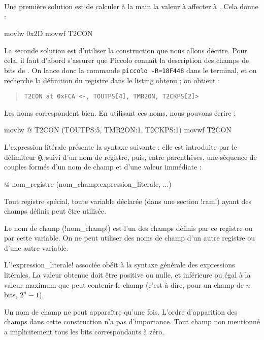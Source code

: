 Une première solution est de calculer à la main la valeur à affecter à . Cela donne :
\begin{piccolo}
movlw   0x2D
movwf   T2CON
\end{piccolo}

La seconde solution est d'utiliser la construction que nous allons décrire. Pour cela, il faut d'abord s’assurer que Piccolo connaît la description des champs de bits de . On lance donc la commande \texttt{piccolo -R=18F448} dans le terminal, et on recherche la définition du registre  dans le listing obtenu ; on obtient :
\begin{quote}
\texttt{\textquotesingle T2CON\textquotesingle~at 0xFCA <-, TOUTPS[4], TMR2ON, T2CKPS[2]>}
\end{quote}

Les noms correspondent bien. En utilisant ces noms, nous pouvons écrire :
\begin{piccolo}
movlw   @ T2CON (TOUTPS:5, TMR2ON:1, T2CKPS:1)
movwf   T2CON
\end{piccolo}

L'expression litérale présente la syntaxe suivante : elle est introduite par le délimiteur \texttt{@}, suivi d’un nom de registre, puis, entre parenthèses, une séquence de couples formés d’un nom de champ et d’une valeur immédiate :
\begin{piccolo}
  @ nom_registre (nom_champ:expression_literale, ...)
\end{piccolo}

Tout registre spécial, toute variable déclarée (dans une section \pic!ram!) ayant des champs définis peut être utilisée.

Le nom de champ (\pic!nom_champ!) est l’un des champs définis par ce registre ou par cette variable. On ne peut utiliser des noms de champ d’un autre registre ou d’une autre variable.

L’\pic!expression_literale! associée obéit à la syntaxe générale des expressions litérales. La valeur obtenue doit être positive ou nulle, et inférieure ou égal à la valeur maximum que peut contenir le champ (c’est à dire, pour un champ de $n$ bits, $2^n-1$).

Un nom de champ ne peut apparaître qu’une fois. L’ordre d’apparition des champs dans cette construction n’a pas d’importance. Tout champ non mentionné a implicitement tous les bits correspondants à zéro.


